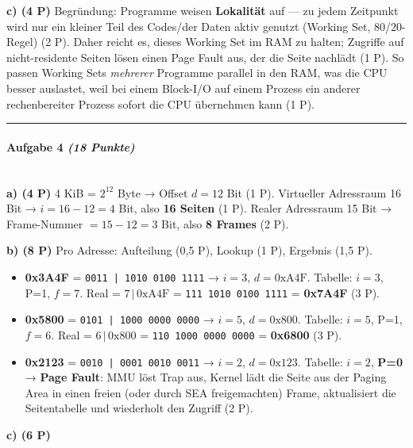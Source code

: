 \documentclass[11pt, a4paper]{article}
\begin{document}
\textbf{c) (4 P)} Begründung: Programme weisen \textbf{Lokalität} auf — zu jedem Zeitpunkt wird nur ein kleiner Teil des Codes/der Daten aktiv genutzt (Working Set, 80/20-Regel) (2 P). Daher reicht es, dieses Working Set im RAM zu halten; Zugriffe auf nicht-residente Seiten lösen einen Page Fault aus, der die Seite nachlädt (1 P). So passen Working Sets \textit{mehrerer} Programme parallel in den RAM, was die CPU besser auslastet, weil bei einem Block-I/O auf einem Prozess ein anderer rechenbereiter Prozess sofort die CPU übernehmen kann (1 P).



\noindent\textcolor{rulegray}{\rule{\linewidth}{0.4pt}}


\paragraph{Aufgabe 4 \textit{(18 Punkte)}}\mbox{}\\[2pt]

\textbf{a) (4 P)} 4 KiB = $2^{12}$ Byte → Offset $d = 12$ Bit (1 P). Virtueller Adressraum 16 Bit → $i = 16-12 = 4$ Bit, also \textbf{16 Seiten} (1 P). Realer Adressraum 15 Bit → Frame-Nummer $= 15-12 = 3$ Bit, also \textbf{8 Frames} (2 P).


\textbf{b) (8 P)} Pro Adresse: Aufteilung (0,5 P), Lookup (1 P), Ergebnis (1,5 P).


\begin{itemize}
  \item \textbf{0x3A4F} = \texttt{0011 | 1010 0100 1111} → $i = 3$, $d = 0\text{xA4F}$. Tabelle: $i=3$, P=1, $f=7$. Real = $7\,|\,0\text{xA4F}$ = \texttt{111 1010 0100 1111} = \textbf{0x7A4F} (3 P).
  \item \textbf{0x5800} = \texttt{0101 | 1000 0000 0000} → $i = 5$, $d = 0\text{x800}$. Tabelle: $i=5$, P=1, $f=6$. Real = $6\,|\,0\text{x800}$ = \texttt{110 1000 0000 0000} = \textbf{0x6800} (3 P).
  \item \textbf{0x2123} = \texttt{0010 | 0001 0010 0011} → $i = 2$, $d = 0\text{x123}$. Tabelle: $i=2$, \textbf{P=0} → \textbf{Page Fault}: MMU löst Trap aus, Kernel lädt die Seite aus der Paging Area in einen freien (oder durch SEA freigemachten) Frame, aktualisiert die Seitentabelle und wiederholt den Zugriff (2 P).
\end{itemize}

\textbf{c) (6 P)}
\end{document}
